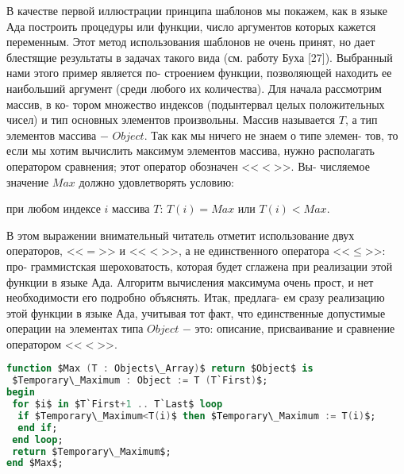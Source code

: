 \documentclass{./git_rep/mai_prac_2017/template/mai_book}
\begin{document}
В качестве первой иллюстрации принципа шаблонов мы покажем,\linebreak
как в языке Ада построить процедуры или функции, число аргументов\linebreak
которых кажется переменным. Этот метод использования шаблонов не\linebreak
очень принят,  но дает блестящие результаты в задачах такого вида\linebreak
(см.  работу Буха [27]).  Выбранный нами этого пример является по-\linebreak
строением функции, позволяющей находить ее  наибольший аргумент\linebreak
(среди любого их количества). Для начала рассмотрим массив,  в ко­-\linebreak
тором множество индексов (подынтервал целых положительных чисел)\linebreak
и тип основных элементов произвольны. Массив называется $T$, а тип\linebreak
элементов массива $-$ $Object$. Так как мы ничего не знаем о типе элемен-\linebreak
тов, то если мы хотим вычислить максимум элементов массива, нужно\linebreak
располагать оператором сравнения; этот оператор обозначен <<$<$>>. Вы-\linebreak
числяемое значение $Max$ должно удовлетворять условию:
\begin{center}
при любом индексе $i$ массива $T$: $T(i)=Max$ или $T(i)<Max$.
\end{center}
В этом  выражении  внимательный  читатель  отметит  использование\linebreak
двух операторов,  <<$=$>>  и  <<$<$>>,  а не единственного оператора <<$\leqslant$>>:  про-\linebreak
граммистская шероховатость, которая будет сглажена при реализации\linebreak
этой функции в языке Ада.  Алгоритм вычисления  максимума очень\linebreak
прост, и нет необходимости его подробно объяснять. Итак, предлага-\linebreak
ем сразу реализацию этой функции в языке Ада, учитывая тот факт,\linebreak
что единственные допустимые операции на элементах типа $Object$ $-$\linebreak
это: описание, присваивание и сравнение оператором <<$<$>>.
\begin{lstlisting}[mathescape=true, language=Ada, frame=none, xleftmargin=20pt]
function $Max (T : Objects\_Array)$ return $Object$ is
 $Temporary\_Maximum : Object := T (T`First)$;
begin
 for $i$ in $T`First+1 .. T`Last$ loop
  if $Temporary\_Maximum<T(i)$ then $Temporary\_Maximum := T(i)$;
  end if;
 end loop;
 return $Temporary\_Maximum$;
end $Max$;
\end{lstlisting}
\end{document}
